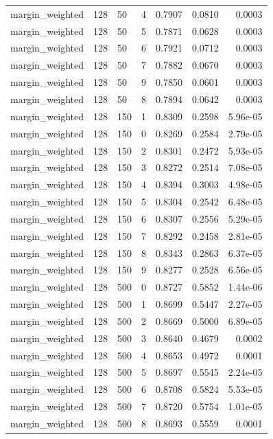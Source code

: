 \begin{footnotesize}
\begin{longtable}{lllrrrr}
margin\_weighted & 128 & 50 & 4 & 0.7907 & 0.0810 & 0.0003 \\
margin\_weighted & 128 & 50 & 5 & 0.7871 & 0.0628 & 0.0003 \\
margin\_weighted & 128 & 50 & 6 & 0.7921 & 0.0712 & 0.0003 \\
margin\_weighted & 128 & 50 & 7 & 0.7882 & 0.0670 & 0.0003 \\
margin\_weighted & 128 & 50 & 9 & 0.7850 & 0.0601 & 0.0003 \\
margin\_weighted & 128 & 50 & 8 & 0.7894 & 0.0642 & 0.0003 \\
margin\_weighted & 128 & 150 & 1 & 0.8309 & 0.2598 & 5.96e-05 \\
margin\_weighted & 128 & 150 & 0 & 0.8269 & 0.2584 & 2.79e-05 \\
margin\_weighted & 128 & 150 & 2 & 0.8301 & 0.2472 & 5.93e-05 \\
margin\_weighted & 128 & 150 & 3 & 0.8272 & 0.2514 & 7.08e-05 \\
margin\_weighted & 128 & 150 & 4 & 0.8394 & 0.3003 & 4.98e-05 \\
margin\_weighted & 128 & 150 & 5 & 0.8304 & 0.2542 & 6.48e-05 \\
margin\_weighted & 128 & 150 & 6 & 0.8307 & 0.2556 & 5.29e-05 \\
margin\_weighted & 128 & 150 & 7 & 0.8292 & 0.2458 & 2.81e-05 \\
margin\_weighted & 128 & 150 & 8 & 0.8343 & 0.2863 & 6.37e-05 \\
margin\_weighted & 128 & 150 & 9 & 0.8277 & 0.2528 & 6.56e-05 \\
margin\_weighted & 128 & 500 & 0 & 0.8727 & 0.5852 & 1.44e-06 \\
margin\_weighted & 128 & 500 & 1 & 0.8699 & 0.5447 & 2.27e-05 \\
margin\_weighted & 128 & 500 & 2 & 0.8669 & 0.5000 & 6.89e-05 \\
margin\_weighted & 128 & 500 & 3 & 0.8640 & 0.4679 & 0.0002 \\
margin\_weighted & 128 & 500 & 4 & 0.8653 & 0.4972 & 0.0001 \\
margin\_weighted & 128 & 500 & 5 & 0.8697 & 0.5545 & 2.24e-05 \\
margin\_weighted & 128 & 500 & 6 & 0.8708 & 0.5824 & 5.53e-05 \\
margin\_weighted & 128 & 500 & 7 & 0.8720 & 0.5754 & 1.01e-05 \\
margin\_weighted & 128 & 500 & 8 & 0.8693 & 0.5559 & 0.0001 \\

\end{longtable}
\end{footnotesize}
